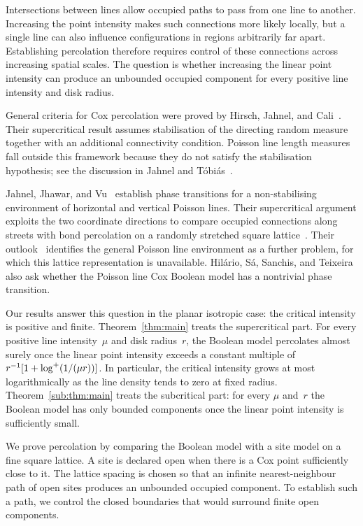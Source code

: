 \documentclass[11pt,letterpaper]{article}
\begin{document}
Intersections between lines allow occupied paths to pass from one line to another. Increasing the point intensity makes such connections more likely locally, but a single line can also influence configurations in regions arbitrarily far apart. Establishing percolation therefore requires control of these connections across increasing spatial scales. The question is whether increasing the linear point intensity can produce an unbounded occupied component for every positive line intensity and disk radius.

General criteria for Cox percolation were proved by Hirsch, Jahnel, and Cali~\cite[Section~2.1]{HJC19}. Their supercritical result assumes stabilisation of the directing random measure together with an additional connectivity condition. Poisson line length measures fall outside this framework because they do not satisfy the stabilisation hypothesis; see the discussion in Jahnel and T\'obi\'as~\cite[Section~3]{JT22}.

Jahnel, Jhawar, and Vu~\cite{JJV23} establish phase transitions for a non-stabilising environment of horizontal and vertical Poisson lines. Their supercritical argument exploits the two coordinate directions to compare occupied connections along streets with bond percolation on a randomly stretched square lattice~\cite[Sections~1.3 and~2]{JJV23}. Their outlook~\cite[Section~1.4]{JJV23} identifies the general Poisson line environment as a further problem, for which this lattice representation is unavailable. Hil\'ario, S\'a, Sanchis, and Teixeira~\cite[Section~9]{HSST26} also ask whether the Poisson line Cox Boolean model has a nontrivial phase transition.

Our results answer this question in the planar isotropic case: the critical intensity is positive and finite. Theorem~\ref{thm:main} treats the supercritical part. For every positive line intensity~$\mu$ and disk radius~$r$, the Boolean model percolates almost surely once the linear point intensity exceeds a constant multiple of $r^{-1}[1+\log^{+}(1/(\mu r))]$. In particular, the critical intensity grows at most logarithmically as the line density tends to zero at fixed radius. Theorem~\ref{sub:thm:main} treats the subcritical part: for every $\mu$ and~$r$ the Boolean model has only bounded components once the linear point intensity is sufficiently small.

We prove percolation by comparing the Boolean model with a site model on a fine square lattice. A site is declared open when there is a Cox point sufficiently close to it. The lattice spacing is chosen so that an infinite nearest-neighbour path of open sites produces an unbounded occupied component. To establish such a path, we control the closed boundaries that would surround finite open components.
\end{document}
